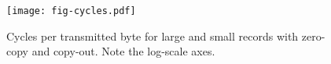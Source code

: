 \begin{figure}[H]
\texttt{[image: fig-cycles.pdf]}
\caption{Cycles per transmitted byte for large and small records with zero-copy and copy-out. Note the log-scale axes.}
\label{fig:cycles}
\end{figure}
